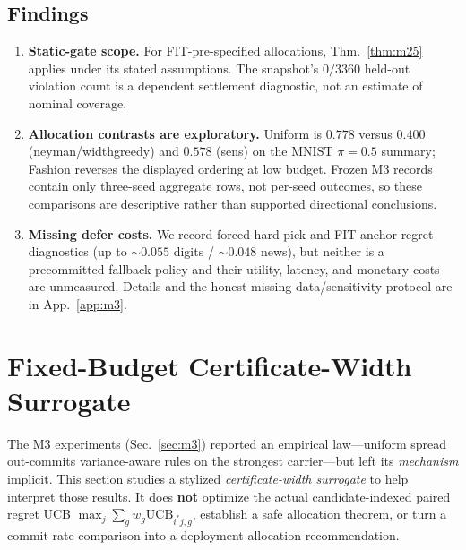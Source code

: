 \documentclass{article}
\begin{document}
\subsection{Findings}
\begin{enumerate}
\item \textbf{Static-gate scope.} For FIT-pre-specified allocations, Thm.~\ref{thm:m25}
applies under its stated assumptions. The snapshot's $0/3360$ held-out violation count is a
dependent settlement diagnostic, not an estimate of nominal coverage.
\item \textbf{Allocation contrasts are exploratory.} Uniform is $0.778$ versus $0.400$
(neyman/widthgreedy) and $0.578$ (sens) on the MNIST $\pi{=}0.5$ summary; Fashion reverses
the displayed ordering at low budget. Frozen M3 records contain only three-seed aggregate
rows, not per-seed outcomes, so these comparisons are descriptive rather than supported
directional conclusions.
\item \textbf{Missing defer costs.} We record forced hard-pick and FIT-anchor regret
diagnostics (up to $\sim0.055$ digits / $\sim0.048$ news), but neither is a precommitted
fallback policy and their utility, latency, and monetary costs are unmeasured. Details and the
honest missing-data/sensitivity protocol are in App.~\ref{app:m3}.
\end{enumerate}

\section{Fixed-Budget Certificate-Width Surrogate}
\label{sec:m35}

The M3 experiments (Sec.~\ref{sec:m3}) reported an empirical law---uniform spread
out-commits variance-aware rules on the strongest carrier---but left its \emph{mechanism}
implicit. This section studies a stylized \emph{certificate-width surrogate} to help interpret
those results. It does \textbf{not} optimize the actual candidate-indexed paired regret UCB
$\max_j\sum_g w_g\mathrm{UCB}_{i^*j,g}$, establish a safe allocation theorem, or turn a
commit-rate comparison into a deployment allocation recommendation.
\end{document}
